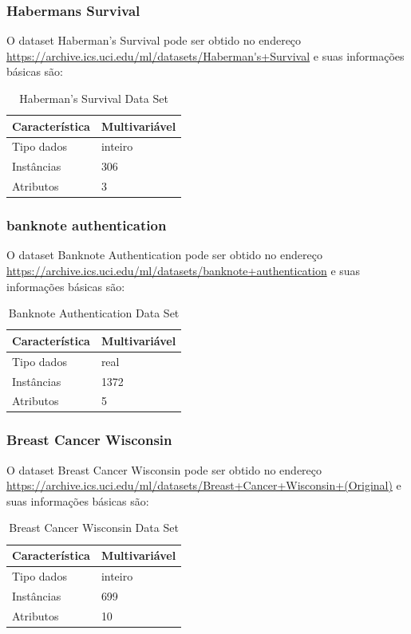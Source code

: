 \documentclass[12pt, a4paper, brazil]{article}
\begin{document}
\subsubsection{Habermans Survival}
O dataset Haberman's Survival pode ser obtido no endereço \url{https://archive.ics.uci.edu/ml/datasets/Haberman's+Survival} e suas informações básicas são:
\begin{table}[!ht]
\centering
\caption{Haberman's Survival Data Set}
\label{habermanstable}
\begin{tabular}{|l|l|}
\hline
Característica & Multivariável\\
\hline
Tipo dados & inteiro\\
\hline
Instâncias & 306\\
\hline
Atributos & 3\\
\hline
\end{tabular}
\end{table}

\subsubsection{banknote authentication}
O dataset Banknote Authentication pode ser obtido no endereço \url{https://archive.ics.uci.edu/ml/datasets/banknote+authentication} e suas informações básicas são:
\begin{table}[!ht]
\centering
\caption{Banknote Authentication Data Set}
\label{banknotetable}
\begin{tabular}{|l|l|}
\hline
Característica & Multivariável\\
\hline
Tipo dados & real\\
\hline
Instâncias & 1372\\
\hline
Atributos & 5\\
\hline
\end{tabular}
\end{table}

\subsubsection{Breast Cancer Wisconsin}
O dataset Breast Cancer Wisconsin pode ser obtido no endereço \url{https://archive.ics.uci.edu/ml/datasets/Breast+Cancer+Wisconsin+(Original)} e suas informações básicas são:
\begin{table}[!ht]
\centering
\caption{Breast Cancer Wisconsin Data Set}
\label{breasttable}
\begin{tabular}{|l|l|}
\hline
Característica & Multivariável\\
\hline
Tipo dados & inteiro \\
\hline
Instâncias & 699 \\
\hline
Atributos & 10\\
\hline
\end{tabular}
\end{table}
\end{document}
